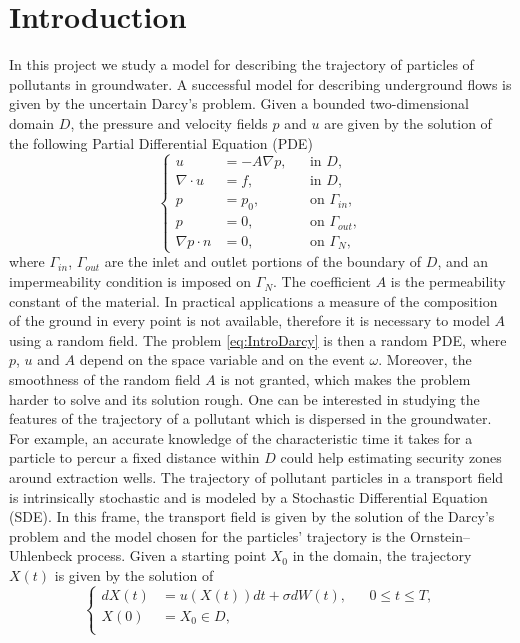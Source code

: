 \section{Introduction}

In this project we study a model for describing the trajectory of particles of pollutants in groundwater. A successful model for describing underground flows is given by the uncertain Darcy's problem. Given a bounded two-dimensional domain $D$, the pressure and velocity fields $p$ and $u$ are given by the solution of the following Partial Differential Equation (PDE)
\begin{equation}
	\label{eq:IntroDarcy}
	\left \{
  	\begin{aligned}
		u &= -A \nabla p, && \text{in } D, \\
		\nabla\cdot u &= f, && \text{in } D, \\
		p &= p_0, && \text{on } \Gamma_{in},\\
		p &= 0, && \text{on } \Gamma_{out}, \\
		\nabla p \cdot n &= 0, && \text{on } \Gamma_N,
	\end{aligned} \right.
\end{equation}
where $\Gamma_{in}$, $\Gamma_{out}$ are the inlet and outlet portions of the boundary of $D$, and an impermeability condition is imposed on $\Gamma_N$. The coefficient $A$ is the permeability constant of the material. In practical applications a measure of the composition of the ground in every point is not available, therefore it is necessary to model $A$ using a random field. The problem \eqref{eq:IntroDarcy} is then a random PDE, where $p$, $u$ and $A$ depend on the space variable and on the event $\omega$. Moreover, the smoothness of the random field $A$ is not granted, which makes the problem harder to solve and its solution rough. One can be interested in studying the features of the trajectory of a pollutant which is dispersed in the groundwater. For example, an accurate knowledge of the characteristic time it takes for a particle to percur a fixed distance within $D$ could help estimating security zones around extraction wells. The trajectory of pollutant particles in a transport field is intrinsically stochastic and is modeled by a Stochastic Differential Equation (SDE). In this frame, the transport field is given by the solution of the Darcy's problem and the model chosen for the particles' trajectory is the Ornstein–Uhlenbeck process. Given a starting point $X_0$ in the domain, the trajectory $X(t)$ is given by the solution of
\begin{equation}
	\label{eq:IntroSDE}
	\left \{
	\begin{aligned}
		dX(t) &= u(X(t)) dt + \sigma dW(t), && 0 \leq t \leq T, \\
		X(0) &= X_0 \in D, \\
	\end{aligned} \right.
\end{equation}
